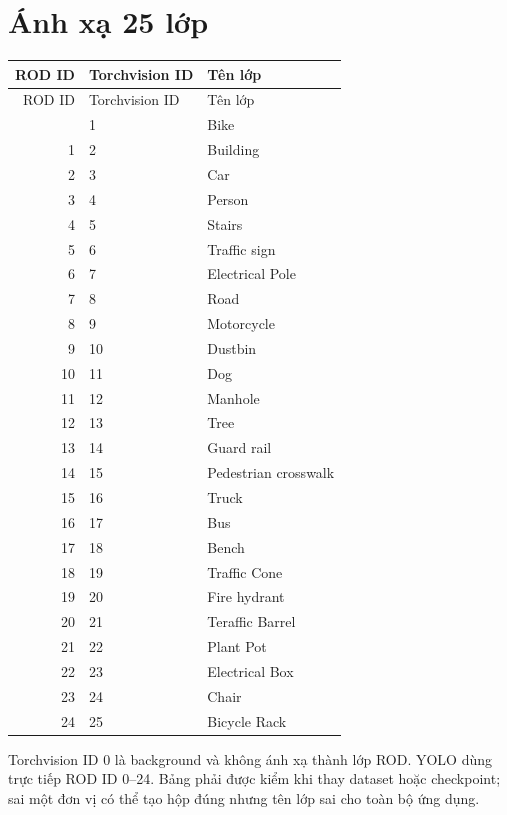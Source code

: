 \documentclass[12pt,a4paper,oneside]{report}
\begin{document}
\section{Ánh xạ 25 lớp}
\begin{longtable}{rll}
\toprule ROD ID & Torchvision ID & Tên lớp\\\midrule\endfirsthead
\toprule ROD ID & Torchvision ID & Tên lớp\\\midrule\endhead
\endfoot
\bottomrule\endlastfoot
0&1&Bike\\1&2&Building\\2&3&Car\\3&4&Person\\4&5&Stairs\\
5&6&Traffic sign\\6&7&Electrical Pole\\7&8&Road\\8&9&Motorcycle\\9&10&Dustbin\\
10&11&Dog\\11&12&Manhole\\12&13&Tree\\13&14&Guard rail\\14&15&Pedestrian crosswalk\\
15&16&Truck\\16&17&Bus\\17&18&Bench\\18&19&Traffic Cone\\19&20&Fire hydrant\\
20&21&Teraffic Barrel\\21&22&Plant Pot\\22&23&Electrical Box\\23&24&Chair\\24&25&Bicycle Rack\\
\end{longtable}

Torchvision ID 0 là background và không ánh xạ thành lớp ROD. YOLO dùng trực tiếp ROD ID 0--24. Bảng phải được kiểm khi thay dataset hoặc checkpoint; sai một đơn vị có thể tạo hộp đúng nhưng tên lớp sai cho toàn bộ ứng dụng.
\end{document}

